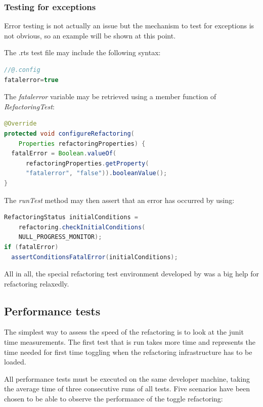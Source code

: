 \subsubsection{Testing for exceptions}

Error testing is not actually an issue but the mechanism to test for exceptions 
is not obvious, so an example will be shown at this point. 

The .rts test file may include the following syntax:

\begin{lstlisting}[language=java]
//@.config
fatalerror=true
\end{lstlisting}

The \textit{fatalerror} variable may be retrieved using a member function of \textit{RefactoringTest}:
\begin{lstlisting}[language=java]
@Override
protected void configureRefactoring(
    Properties refactoringProperties) {
  fatalError = Boolean.valueOf(
      refactoringProperties.getProperty(
      "fatalerror", "false")).booleanValue();
}
\end{lstlisting}

The \textit{runTest} method may then assert that an error has occurred by using:
\begin{lstlisting}[language=java]
RefactoringStatus initialConditions = 
    refactoring.checkInitialConditions(
    NULL_PROGRESS_MONITOR);
if (fatalError)
  assertConditionsFatalError(initialConditions);
\end{lstlisting}

All in all, the special refactoring test environment developed by \cite{GB06} 
was a big help for refactoring relaxedly.

\subsection{Performance tests}

The simplest way to assess the speed of the refactoring is to look at the junit 
time measurements. The first test that is run takes more time and represents the 
time needed for first time toggling when the refactoring infrastructure has to 
be loaded. 

All performance tests must be executed on the same developer machine, taking the 
average time of three consecutive runs of all tests. Five scenarios have been 
chosen to be able to observe the performance of the toggle refactoring:

